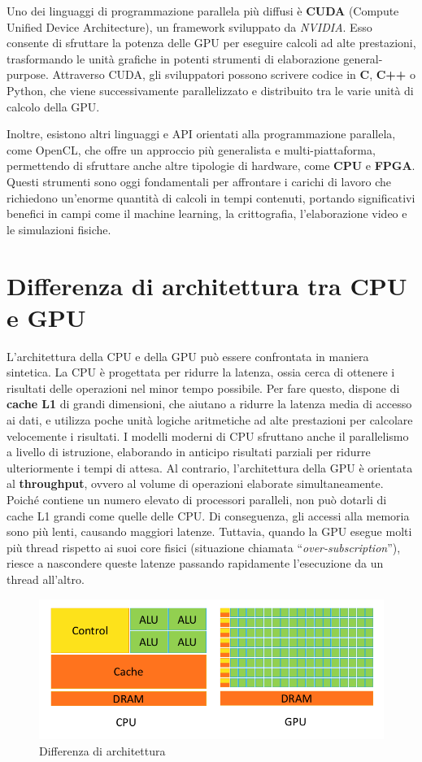 \documentclass[12pt,a4paper]{report}
\begin{document}
Uno dei linguaggi di programmazione parallela più diffusi è \textbf{CUDA} (Compute Unified Device Architecture), un framework sviluppato da \textit{NVIDIA}.    Esso consente di sfruttare la potenza delle GPU per eseguire calcoli ad alte prestazioni, trasformando le unità grafiche in potenti strumenti di elaborazione general-purpose. Attraverso CUDA, gli sviluppatori possono scrivere codice in \textbf{C}, \textbf{C++} o Python, che viene successivamente parallelizzato e distribuito tra le varie unità di calcolo della GPU.

Inoltre, esistono altri linguaggi e API orientati alla programmazione parallela, come OpenCL, che offre un approccio più generalista e multi-piattaforma, permettendo di sfruttare anche altre tipologie di hardware, come \textbf{CPU} e \textbf{FPGA}. Questi strumenti sono oggi fondamentali per affrontare i carichi di lavoro che richiedono un’enorme quantità di calcoli in tempi contenuti, portando significativi benefici in campi come il machine learning, la crittografia, l’elaborazione video e le simulazioni fisiche.

\section{Differenza di architettura tra CPU e GPU}

L'architettura della CPU e della GPU può essere confrontata in maniera sintetica. La CPU è progettata per ridurre la latenza, ossia cerca di ottenere i risultati delle operazioni nel minor tempo possibile. Per fare questo, dispone di \textbf{cache L1} di grandi dimensioni, che aiutano a ridurre la latenza media di accesso ai dati, e utilizza poche unità logiche aritmetiche ad alte prestazioni per calcolare velocemente i risultati. I modelli moderni di CPU sfruttano anche il parallelismo a livello di istruzione, elaborando in anticipo risultati parziali per ridurre ulteriormente i tempi di attesa. Al contrario, l'architettura della GPU è orientata al \textbf{throughput}, ovvero al volume di operazioni elaborate simultaneamente. Poiché contiene un numero elevato di processori paralleli, non può dotarli di cache L1 grandi come quelle delle CPU. Di conseguenza, gli accessi alla memoria sono più lenti, causando maggiori latenze. Tuttavia, quando la GPU esegue molti più thread rispetto ai suoi core fisici (situazione chiamata “\textit{over-subscription}”), riesce a nascondere queste latenze passando rapidamente l'esecuzione da un thread all'altro.


\begin{figure}[h]
    \includegraphics[width=1\linewidth]{img/CPUvsGPU.png}
    \caption{Differenza di architettura \cite{CUDAtutorial}}
\end{figure}
\end{document}
